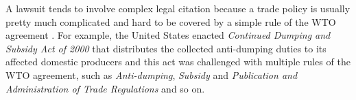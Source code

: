 A lawsuit tends to involve complex legal citation because a trade policy is usually pretty much complicated 
and hard to be covered by a simple rule of the WTO agreement \citep{jackson1997world}.
For example, the United States enacted \textit{Continued Dumping and Subsidy Act of 2000} that distributes 
the collected anti-dumping duties to its affected domestic producers and this act was challenged with multiple rules of the WTO agreement, 
such as \textit{Anti-dumping}, \textit{Subsidy} and \textit{Publication and Administration of Trade Regulations} and so on. 

